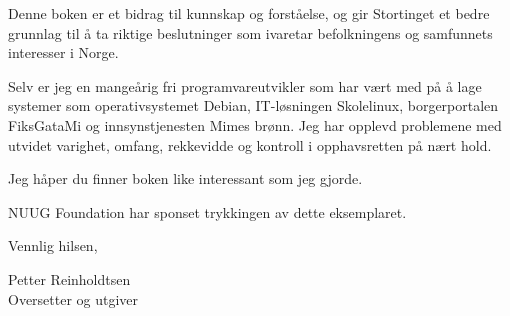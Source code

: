\documentclass[a4paper, 11pt, norsk]{article}
\begin{document}
Denne boken er et bidrag til kunnskap og forståelse, og gir Stortinget
et bedre grunnlag til å ta riktige beslutninger som ivaretar
befolkningens og samfunnets interesser i Norge.

Selv er jeg en mangeårig fri programvareutvikler som har vært med på å
lage systemer som operativsystemet Debian, IT-løsningen Skolelinux,
borgerportalen FiksGataMi og innsynstjenesten Mimes brønn.  Jeg har
opplevd problemene med utvidet varighet, omfang, rekkevidde og
kontroll i opphavsretten på nært hold.

Jeg håper du finner boken like interessant som jeg gjorde.

NUUG Foundation har sponset trykkingen av dette eksemplaret.

Vennlig hilsen,

\vspace{5\parskip}

Petter Reinholdtsen \\
Oversetter og utgiver
\end{document}
